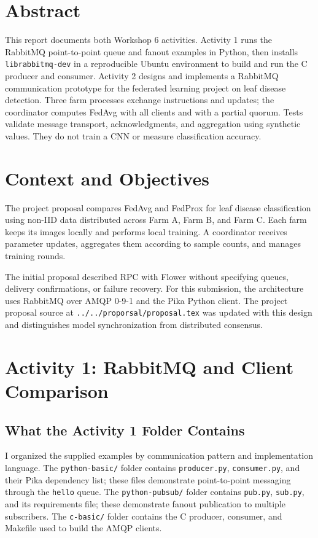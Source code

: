 ﻿\documentclass[11pt,a4paper]{article}
\begin{document}
\begin{titlepage}
\vfill\end{titlepage}\section*{Abstract}This report documents both Workshop 6 activities. Activity 1 runs the RabbitMQ point-to-point queue and fanout examples in Python, then installs \texttt{librabbitmq-dev} in a reproducible Ubuntu environment to build and run the C producer and consumer. Activity 2 designs and implements a RabbitMQ communication prototype for the federated learning project on leaf disease detection. Three farm processes exchange instructions and updates; the coordinator computes FedAvg with all clients and with a partial quorum. Tests validate message transport, acknowledgments, and aggregation using synthetic values. They do not train a CNN or measure classification accuracy.
\section{Context and Objectives}The project proposal compares FedAvg and FedProx for leaf disease classification using non-IID data distributed across Farm A, Farm B, and Farm C. Each farm keeps its images locally and performs local training. A coordinator receives parameter updates, aggregates them according to sample counts, and manages training rounds.

The initial proposal described RPC with Flower without specifying queues, delivery confirmations, or failure recovery. For this submission, the architecture uses RabbitMQ over AMQP 0-9-1 and the Pika Python client. The project proposal source at \texttt{../../proporsal/proposal.tex} was updated with this design and distinguishes model synchronization from distributed consensus.
\section{Activity 1: RabbitMQ and Client Comparison}
\subsection{What the Activity 1 Folder Contains}
I organized the supplied examples by communication pattern and implementation language. The \texttt{python-basic/} folder contains \texttt{producer.py}, \texttt{consumer.py}, and their Pika dependency list; these files demonstrate point-to-point messaging through the \texttt{hello} queue. The \texttt{python-pubsub/} folder contains \texttt{pub.py}, \texttt{sub.py}, and its requirements file; these demonstrate fanout publication to multiple subscribers. The \texttt{c-basic/} folder contains the C producer, consumer, and Makefile used to build the AMQP clients.
\end{document}
